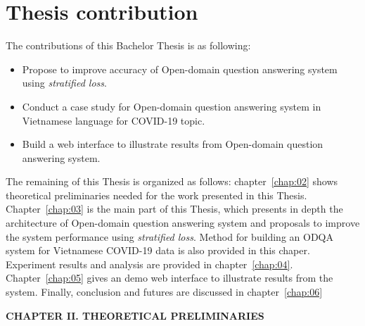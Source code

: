 \documentclass[3p, sort&compress, 12pt]{elsarticle}
\begin{document}
\section{Thesis contribution}
The contributions of this Bachelor Thesis is as following:
\begin{itemize}
\item Propose to improve accuracy of Open-domain question answering system using \textit{stratified loss}.
\item Conduct a case study for Open-domain question answering system in Vietnamese language for COVID-19 topic.
\item Build a web interface to illustrate results from Open-domain question answering system.
\end{itemize}
\par The remaining of this Thesis is organized as follows: chapter~\ref{chap:02} shows theoretical preliminaries needed for the work presented in this Thesis. Chapter~\ref{chap:03} is the main part of this Thesis, which presents in depth the architecture of Open-domain question answering system and proposals to improve the system performance using \textit{stratified loss}. Method for building an ODQA system for Vietnamese COVID-19 data is also provided in this chaper. Experiment results and analysis are provided in chapter~\ref{chap:04}. Chapter~\ref{chap:05} gives an demo web interface to illustrate results from the system. Finally, conclusion and futures are discussed in chapter~\ref{chap:06}
\newpage
\begin{center}
	\fontsize{20}{14pt}\selectfont\sf\bfseries CHAPTER II. THEORETICAL PRELIMINARIES
\end{center}
\label{chap:02}
\setcounter{section}{0}
\end{document}
